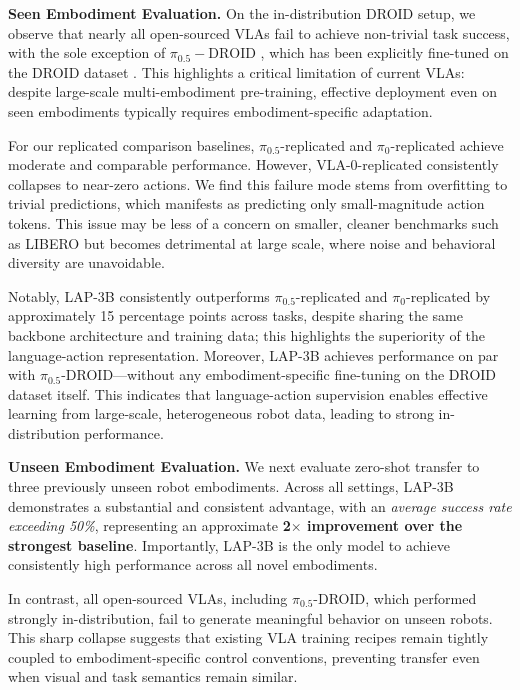 \noindent\textbf{Seen Embodiment Evaluation.} On the in-distribution DROID setup, we observe that nearly all open-sourced VLAs fail to achieve non-trivial task success, with the sole exception of $\pi_{0.5}-\text{DROID}$ \cite{intelligence2025pi05visionlanguageactionmodelopenworld}, which has been explicitly fine-tuned on the DROID dataset \cite{khazatsky2025droidlargescaleinthewildrobot}. This highlights a critical limitation of current VLAs: despite large-scale multi-embodiment pre-training, effective deployment even on seen embodiments typically requires embodiment-specific adaptation. 

For our replicated comparison baselines, $\pi_{0.5}$-replicated and $\pi_{0}$-replicated achieve moderate and comparable performance. However, $\text{VLA-0}$-replicated consistently collapses to near-zero actions. We find this failure mode stems from overfitting to trivial predictions, which manifests as predicting only small-magnitude action tokens. This issue may be less of a concern on smaller, cleaner benchmarks such as LIBERO \cite{liu2023liberobenchmarkingknowledgetransfer} but becomes detrimental at large scale, where noise and behavioral diversity are unavoidable.

Notably, \textsc{LAP-3B} consistently outperforms $\pi_{0.5}$-replicated and $\pi_{0}$-replicated by approximately 15 percentage points across tasks, despite sharing the same backbone architecture and training data; this highlights the superiority of the language-action representation. Moreover, \textsc{LAP-3B} achieves performance on par with $\pi_{0.5}$-DROID---without any embodiment-specific fine-tuning on the DROID dataset itself. This indicates that language-action supervision enables effective learning from large-scale, heterogeneous robot data, leading to strong in-distribution performance.


\noindent\textbf{Unseen Embodiment Evaluation.} We next evaluate zero-shot transfer to three previously unseen robot embodiments. Across all settings, \textsc{LAP-3B} demonstrates a substantial and consistent advantage, with an \emph{average success rate exceeding 50\%}, representing an approximate \textbf{2$\times$ improvement over the strongest baseline}. Importantly, \textsc{LAP-3B} is the only model to achieve consistently high performance across all novel embodiments.

In contrast, all open-sourced VLAs, including $\pi_{0.5}$-DROID, which performed strongly in-distribution, fail to generate meaningful behavior on unseen robots. This sharp collapse suggests that existing VLA training recipes remain tightly coupled to embodiment-specific control conventions, preventing transfer even when visual and task semantics remain similar.



